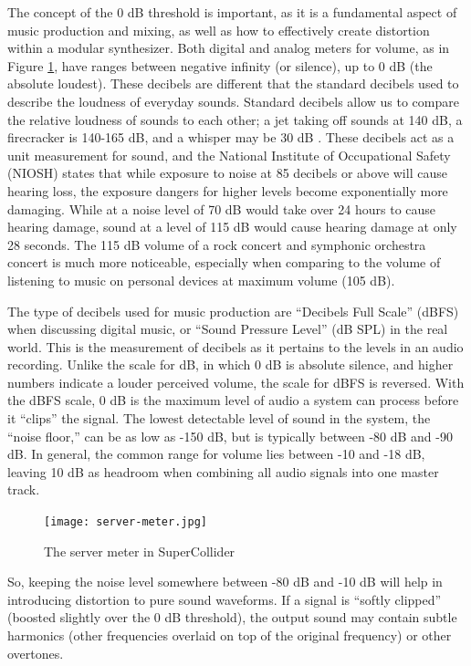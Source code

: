 The concept of the 0 dB threshold is important, as it is a fundamental aspect of music production and mixing, as well as how to effectively create distortion within a modular synthesizer. Both digital and analog meters for volume, as in Figure \ref{fig:server-meter}, have ranges between negative infinity (or silence), up to 0 dB (the absolute loudest). These decibels are different that the standard decibels used to describe the loudness of everyday sounds. Standard decibels allow us to compare the relative loudness of sounds to each other; a jet taking off sounds at 140 dB, a firecracker is 140-165 dB, and a whisper may be 30 dB \cite{Hearing_Health_Foundation}. These decibels act as a unit measurement for sound, and the National Institute of Occupational Safety (NIOSH) states that while exposure to noise at 85 decibels or above  will cause hearing loss, the exposure dangers for higher levels become exponentially more damaging. While at a noise level of 70 dB would take over 24 hours to cause hearing damage, sound at a level of 115 dB would cause hearing damage at only 28 seconds. The 115 dB volume of a rock concert and symphonic orchestra concert is much more noticeable, especially when comparing to the volume of listening to music on personal devices at maximum volume (105 dB).

The type of decibels used for music production are ``Decibels Full Scale'' (dBFS) when discussing digital music, or ``Sound Pressure Level'' (dB SPL) in the real world. This is the measurement of decibels as it pertains to the levels in an audio recording. Unlike the scale for dB, in which 0 dB is absolute silence, and higher numbers indicate a louder perceived volume, the scale for dBFS is reversed. With the dBFS scale, 0 dB is the maximum level of audio a system can process before it ``clips'' the signal. The lowest detectable level of sound in the system, the ``noise floor,''  can be as low as -150 dB, but is typically between -80 dB and -90 dB. In general, the common range for volume lies between -10 and -18 dB, leaving 10 dB as headroom when combining all audio signals into one master track.

\begin{figure}
  \centering
  \texttt{[image: server-meter.jpg]}
  \caption{The server meter in SuperCollider}
  \label{fig:server-meter}
\end{figure}

So, keeping the noise level somewhere between -80 dB and -10 dB will help in introducing distortion to pure sound waveforms. If a signal is ``softly clipped'' (boosted slightly over the 0 dB threshold), the output sound may contain subtle harmonics (other frequencies overlaid on top of the original frequency) or other overtones. 

